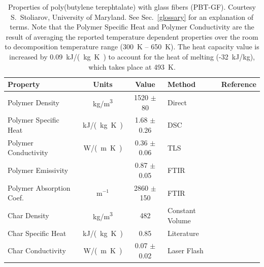 \begin{table}[h!]
\caption[Properties of poly(butylene terephtalate) with glass fibers (PBT-GF)]{Properties of poly(butylene terephtalate) with glass fibers (PBT-GF).
Courtesy S.~Stoliarov, University of Maryland. See Sec.~\ref{glossary} for an explanation of terms. Note that the Polymer Specific Heat and Polymer Conductivity
are the result of averaging the reported temperature dependent properties over the room to decomposition temperature range (300~K -- 650~K).
The heat capacity value is increased by 0.09~\unit{kJ/(kg.K)} to account for the heat of melting (-32~kJ/kg), which takes place at 493~K.}
\begin{center}
\begin{tabular}{|l|c|c|l|l|}
\hline
Property                &      Units    &      Value                        & Method                                    & Reference                     \\ \hline \hline
Polymer Density         &     \unit{kg/m^3}  & 1520 $\pm$ 80                     & Direct                                    & \cite{Kempel:1}               \\ \hline
Polymer Specific Heat   &    \unit{kJ/(kg.K)}    & 1.68 $\pm$ 0.26                   & DSC                                       & \cite{Kempel:1}               \\ \hline
Polymer Conductivity    &    \unit{W/(m.K)}    & 0.36 $\pm$ 0.06                   & TLS                                       & \cite{Kempel:1}               \\ \hline
Polymer Emissivity      &               & 0.87 $\pm$ 0.05                   & FTIR                                      & \cite{Linteris:2}             \\ \hline
Polymer Absorption Coef.&  m$^{-1}$     & 2860 $\pm$ 150                    & FTIR                                      & \cite{Linteris:2}             \\ \hline
Char Density            &     \unit{kg/m^3}  &        482                        & Constant Volume                           & \cite{Kempel:1}               \\ \hline
Char Specific Heat      &    \unit{kJ/(kg.K)}    &        0.85                       & Literature                                & \cite{SCHOTT}                 \\ \hline
Char Conductivity       & \unit{W/(m.K)} & 0.07 $\pm$ 0.02                   & Laser Flash                               & \cite{Kempel:1}               \\ \hline

\end{tabular}
\end{center}
\end{table}
